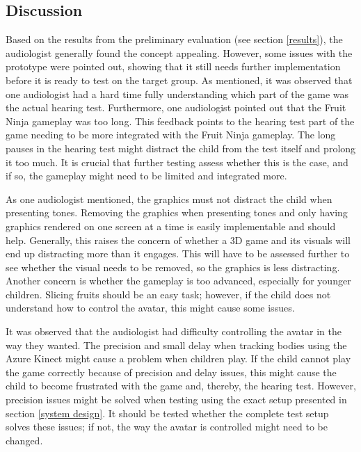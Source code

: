 \subsection{Discussion} \label{disussion}

Based on the results from the preliminary evaluation (see section \ref{results}), the audiologist generally found the concept appealing. However, some issues with the prototype were pointed out, showing that it still needs further implementation before it is ready to test on the target group. As mentioned, it was observed that one audiologist had a hard time fully understanding which part of the game was the actual hearing test. Furthermore, one audiologist pointed out that the Fruit Ninja gameplay was too long. This feedback points to the hearing test part of the game needing to be more integrated with the Fruit Ninja gameplay. The long pauses in the hearing test might distract the child from the test itself and prolong it too much. It is crucial that further testing assess whether this is the case, and if so, the gameplay might need to be limited and integrated more.   \newline

As one audiologist mentioned, the graphics must not distract the child when presenting tones. Removing the graphics when presenting tones and only having graphics rendered on one screen at a time is easily implementable and should help. Generally, this raises the concern of whether a 3D game and its visuals will end up distracting more than it engages. This will have to be assessed further to see whether the visual needs to be removed, so the graphics is less distracting. Another concern is whether the gameplay is too advanced, especially for younger children. Slicing fruits should be an easy task; however, if the child does not understand how to control the avatar, this might cause some issues. \newline

It was observed that the audiologist had difficulty controlling the avatar in the way they wanted. The precision and small delay when tracking bodies using the Azure Kinect might cause a problem when children play. If the child cannot play the game correctly because of precision and delay issues, this might cause the child to become frustrated with the game and, thereby, the hearing test. However, precision issues might be solved when testing using the exact setup presented in section \ref{system design}. It should be tested whether the complete test setup solves these issues; if not, the way the avatar is controlled might need to be changed. \newline 


